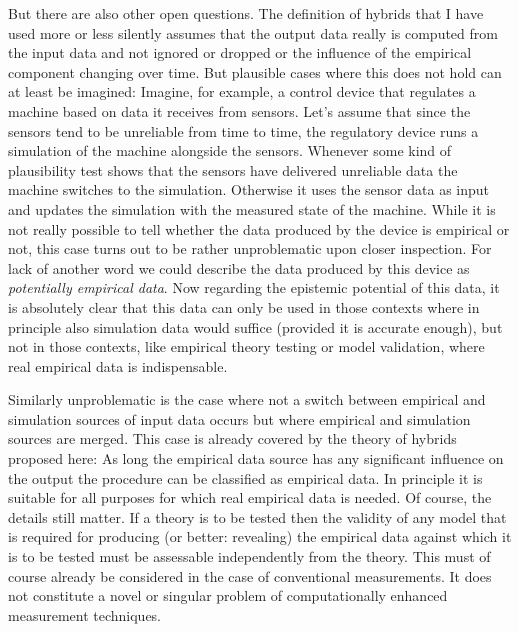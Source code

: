 \documentclass[12pt, a4paper]{article}
\numberwithin{equation}{section}
\begin{document}
But there are also other open questions. The definition of hybrids that I have used more or less silently assumes that the output data really is computed from the input data and not ignored or dropped or the influence of the empirical component changing over time. But plausible cases where this does not hold can at least be imagined: Imagine, for example, a control device that regulates a machine based on data it receives from sensors. Let's assume that since the sensors tend to be unreliable from time to time, the regulatory device runs a simulation of the machine alongside the sensors. Whenever some kind of plausibility test shows that the sensors have delivered unreliable data the machine switches to the simulation. Otherwise it uses the sensor data as input and updates the simulation with the measured state of the machine. While it is not really possible to tell whether the data produced by the device is empirical or not, this case turns out to be rather unproblematic upon closer inspection. For lack of another word we could describe the data produced by this device as {\em potentially empirical data}. Now regarding the epistemic potential of this data, it is absolutely clear that this data can only be used in those contexts where in principle also simulation data would suffice (provided it is accurate enough), but not in those contexts, like empirical theory testing or model validation, where real empirical data is indispensable. 

Similarly unproblematic is the case where not a switch between empirical and simulation sources of input data occurs but where empirical and simulation sources are merged. This case is already covered by the theory of hybrids proposed here: As long the empirical data source has any significant influence on the output the procedure can be classified as empirical data. In principle it is suitable for all purposes for which real empirical data is needed. Of course, the details still matter. If a theory is to be tested then the validity of any model that is required for producing (or better: revealing) the empirical data against which it is to be tested must be assessable independently from the theory. This must of course already be considered in the case of conventional measurements. It does not constitute a novel or singular problem of computationally enhanced measurement techniques.


\newpage


\end{document}
